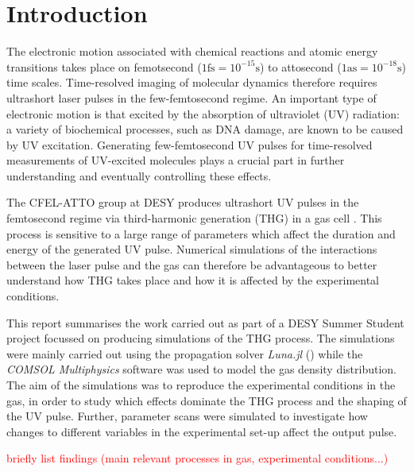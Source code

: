 \documentclass[a4paper]{jpconf}
\begin{document}



\thispagestyle{plain}
\pagestyle{plain}
\setlength{\footskip}{20pt}

\section{Introduction}
The electronic motion associated with chemical reactions and atomic energy transitions takes place on femotsecond ($1 \text{fs} = 10^{-15} \text{s}$) to attosecond ($1 \text{as} = 10^{-18} \text{s}$) time scales. Time-resolved imaging of molecular dynamics therefore requires ultrashort laser pulses in the few-femtosecond regime. An important type of electronic motion is that excited by the absorption of ultraviolet (UV) radiation: a variety of biochemical processes, such as DNA damage, are known to be caused by UV excitation. Generating few-femtosecond UV pulses for time-resolved measurements of UV-excited molecules plays a crucial part in further understanding and eventually controlling these effects. \par 
The CFEL-ATTO group at DESY produces ultrashort UV pulses in the femtosecond regime via third-harmonic generation (THG) in a gas cell \cite{galli2019}. This process is sensitive to a large range of parameters which affect the duration and energy of the generated UV pulse. Numerical simulations of the interactions between the laser pulse and the gas can therefore be advantageous to better understand how THG takes place and how it is affected by the experimental conditions. \par 
This report summarises the work carried out as part of a DESY Summer Student project focussed on producing simulations of the THG process. The simulations were mainly carried out using the propagation solver \textit{Luna.jl} (\cite{brahms2023}) while the \textit{COMSOL Multiphysics} software was used to model the gas density distribution. The aim of the simulations was to reproduce the experimental conditions in the gas, in order to study which effects dominate the THG process and the shaping of the UV pulse. Further, parameter scans were simulated to investigate how changes to different variables in the experimental set-up affect the output pulse. \par 
\textcolor{red}{
briefly list findings (main relevant processes in gas, experimental conditions...)
}
\end{document}
